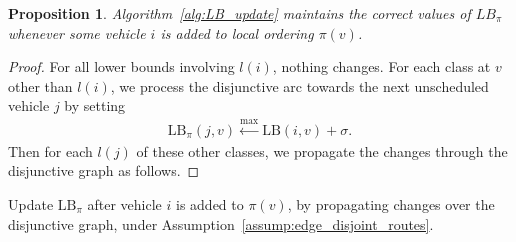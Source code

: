\documentclass[a4paper]{article}
\theoremstyle{definition}
\theoremstyle{plain}
\newtheorem{proposition}{Proposition}
\begin{document}
\begin{proposition}
  Algorithm~\ref{alg:LB_update} maintains the correct values of $LB_{\pi}$
  whenever some vehicle $i$ is added to local ordering $\pi(v)$.
\end{proposition}
\begin{proof}
  For all lower bounds involving $l(i)$, nothing changes.
  For each class at $v$ other than $l(i)$, we process the disjunctive arc
  towards the next unscheduled vehicle $j$ by setting
  \begin{align*}
    \mathrm{LB}_{\pi}(j, v) \xleftarrow{\max} \mathrm{LB}(i, v) + \sigma .
  \end{align*}
  Then for each $l(j)$ of these other classes, we propagate the changes through
  the disjunctive graph as follows.
\end{proof}


\begin{algorithm}
  \caption{Update $\mathrm{LB}_{\pi}$ after vehicle $i$ is added to $\pi(v)$, by
    propagating changes over the disjunctive graph, under
    Assumption~\ref{assump:edge_disjoint_routes}.}\label{alg:LB_update}
\begin{algorithmic}[1]
\end{algorithmic}
\end{algorithm}










\end{document}
